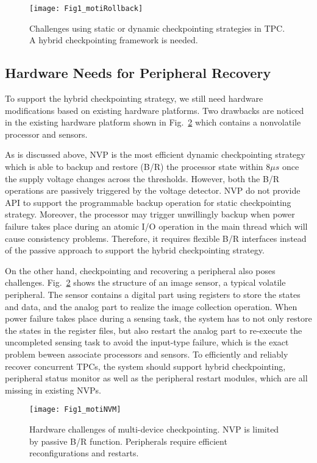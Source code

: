 %   
\begin{figure}[t]
    \centering
    \texttt{[image: Fig1\_motiRollback]}
    \caption{Challenges using static or dynamic checkpointing strategies in TPC. A hybrid checkpointing framework is needed.}
    \label{fig:motiRollback}
\end{figure}

\subsection{Hardware Needs for Peripheral Recovery} \label{sec:motiHW}
%
To support the hybrid checkpointing strategy, we still need hardware modifications based on existing hardware platforms.
Two drawbacks are noticed in the existing hardware platform shown in Fig.~\ref{fig:motiNVM} which contains a nonvolatile processor and sensors.

As is discussed above, NVP is the most efficient dynamic checkpointing strategy which is able to backup and restore (B/R) the processor state within $8\mu s$ once the supply voltage changes across the thresholds. 
However, both the B/R operations are passively triggered by the voltage detector.
NVP do not provide API to support the programmable backup operation for static checkpointing strategy.
Moreover, the processor may trigger unwillingly backup when power failure takes place during an atomic I/O operation in the main thread which will cause consistency problems. 
Therefore, it requires flexible B/R interfaces instead of the passive approach to support the hybrid checkpointing strategy.

On the other hand, checkpointing and recovering a peripheral also poses challenges.
Fig.~\ref{fig:motiNVM} shows the structure of an image sensor, a typical volatile peripheral.
The sensor contains a digital part using registers to store the states and data, and the analog part to realize the image collection operation.
When power failure takes place during a sensing task, the system has to not only restore the states in the register files, but also restart the analog part to re-execute the uncompleted sensing task to avoid the input-type failure, which is the exact problem beween associate processors and sensors.
 To efficiently and reliably recover concurrent TPCs, the system should support hybrid checkpointing, peripheral status monitor as well as the peripheral restart modules, which are all missing in existing NVPs.
\begin{figure}[t]
    \centering
    \texttt{[image: Fig1\_motiNVM]}
    \caption{Hardware challenges of multi-device checkpointing. NVP is limited by passive B/R function. Peripherals require efficient reconfigurations and restarts.}
    \label{fig:motiNVM}
\end{figure}

